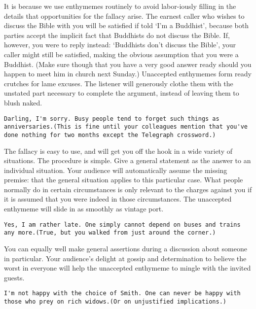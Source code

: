 \documentclass[a4paper,12pt,single,pdftex]{scrartcl}
\begin{document}
      It is because we use enthymemes routinely to avoid labor-iously filling in the details that opportunities for the fallacy arise. The earnest caller who wishes to discuss the Bible with you will be satisfied if told ‘I’m a Buddhist’, because both parties accept the implicit fact that Buddhists do not discuss the Bible. If, however, you were to reply instead: ‘Buddhists don’t discuss the Bible’, your caller might still be satisfied, making the obvious assumption that you were a Buddhist. (Make sure though that you have a very good answer ready should you happen to meet him in church next Sunday.) \newline
Unaccepted enthymemes form ready crutches for lame excuses. The listener will generously clothe them with the unstated part necessary to complete the argument, instead of leaving them to blush naked.
    \\

    \begin{verbatim}Darling, I'm sorry. Busy people tend to forget such things as anniversaries.(This is fine until your colleagues mention that you've done nothing for two months except the Telegraph crossword.)\end{verbatim}
    
      The fallacy is easy to use, and will get you off the hook in a wide variety of situations. The procedure is simple. Give a general statement as the answer to an individual situation. Your audience will automatically assume the missing premise: that the general situation applies to this particular case. What people normally do in certain circumstances is only relevant to the charges against you if it is assumed that you were indeed in those circumstances. The unaccepted enthymeme will slide in as smoothly as vintage port.
    \\

    \begin{verbatim}Yes, I am rather late. One simply cannot depend on buses and trains any more.(True, but you walked from just around the corner.)\end{verbatim}
    
      You can equally well make general assertions during a discussion about someone in particular. Your audience’s delight at gossip and determination to believe the worst in everyone will help the unaccepted enthymeme to mingle with the invited guests.
    \\

    \begin{verbatim}I'm not happy with the choice of Smith. One can never be happy with those who prey on rich widows.(Or on unjustified implications.)\end{verbatim}
  
\end{document}
